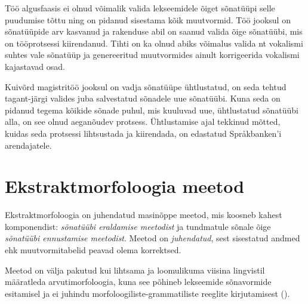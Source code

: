 \documentclass[12pt,a4paper]{article}
\begin{document}
Töö algusfaasis ei olnud võimalik valida lekseemidele õiget sõnatüüpi selle puudumise tõttu ning on pidanud sisestama kõik muutvormid. Töö jooksul on sõnatüüpide arv kasvanud ja rakenduse abil on saanud valida õige sõnatüübi, mis on töö\-protsessi kiirendanud. Tihti on ka olnud abiks võimalus valida nt vokalismi suhtes vale sõnatüüp ja genereeritud muutvormides ainult korrigeerida vokalismi kajastavad osad.

Kuivõrd magistritöö jooksul on vadja sõnatüüpe ühtlustatud, on seda tehtud tagant-järgi valides juba salvestatud sõnadele uue sõnatüübi. Kuna seda on pidanud tegema kõikide sõnade puhul, mis kuuluvad uue, ühtlustatud sõnatüübi alla, on see olnud aega\-nõudev protsess. Ühtlustamise ajal tekkinud mõtted, kuidas seda protsessi lihtsustada ja kiirendada, on edastatud Språkbanken'i arendajatele.


\newpage
\section{Ekstraktmorfoloogia meetod}
\label{sec:ekstraktmorfoloogia-meetod}




Ekstraktmorfoloogia on juhendatud masinõppe meetod, mis koosneb kahest komponendist: \emph{sõnatüübi eraldamise meetodist} ja tundmatule sõnale õige \emph{sõnatüübi ennustamise meetodist}. Meetod on \textit{juhendatud}, sest sisestatud andmed ehk muutvormi\-tabelid peavad olema korrektsed.


Meetod on välja pakutud kui lihtsama ja loomulikuma viisina lingvistil määratleda arvutimorfoloogia, kuna see põhineb lekseemide sõnavormide esitamisel ja ei juhindu morfoloogiliste-grammatiliste reeglite kirjutamisest (\cite[14]{forsberg_what_2016}).
\end{document}
